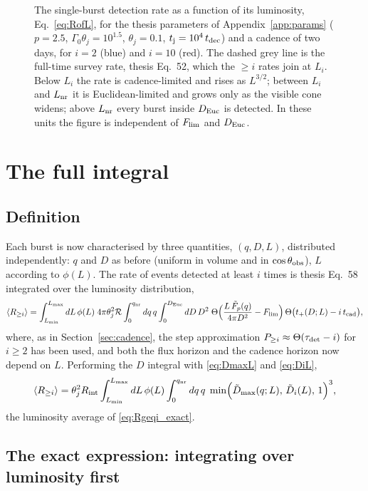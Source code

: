 \documentclass[11pt,a4paper]{article}
\newcommand{\tD}{\tilde{D}}
\newcommand{\tF}{\tilde{F}}
\newcommand{\Euc}{{\rm Euc}}
\newcommand{\nr}{{\rm nr}}
\newcommand{\Flim}{F_{\rm lim}}
\newcommand{\Rint}{R_{\rm int}}
\newcommand{\tcad}{t_{\rm cad}}
\newcommand{\tdec}{t_{\rm dec}}
\newcommand{\tj}{t_{\rm j}}
\newcommand{\Ravg}{\langle R_{\geq i}\rangle}
\newcommand{\Lmin}{L_{\rm min}}
\newcommand{\Lmax}{L_{\rm max}}
\newcommand{\Lnr}{L_{\rm nr}}
\begin{document}
\begin{figure}[t]
\caption{The single-burst detection rate as a function of its luminosity, Eq.~\eqref{eq:RofL}, for the thesis parameters of Appendix~\ref{app:params} ($p=2.5$, $\Gamma_0\theta_j=10^{1.5}$, $\theta_j=0.1$, $\tj=10^4\,\tdec$) and a cadence of two days, for $i=2$ (blue) and $i=10$ (red). The dashed grey line is the full-time survey rate, thesis Eq.~52, which the $\geq i$ rates join at $L_i$. Below $L_i$ the rate is cadence-limited and rises as $L^{3/2}$; between $L_i$ and $\Lnr$ it is Euclidean-limited and grows only as the visible cone widens; above $\Lnr$ every burst inside $D_\Euc$ is detected. In these units the figure is independent of $\Flim$ and $D_\Euc$.}
\label{fig:RofL}
\end{figure}

\section{The full integral}
\label{sec:integral}

\subsection{Definition}

Each burst is now characterised by three quantities, $(q,D,L)$, distributed independently: $q$ and $D$ as before (uniform in volume and in $\cos\theta_{\rm obs}$), $L$ according to $\phi(L)$. The rate of events detected at least $i$ times is thesis Eq.~58 integrated over the luminosity distribution,
\begin{equation}
\label{eq:full3}
\Ravg=\int_{\Lmin}^{\Lmax}dL\,\phi(L)\;4\pi\theta_j^2\mathcal R\int_0^{q_\nr}dq\,q\int_0^{D_\Euc}dD\,D^2\;\Theta\Bigl(\frac{L\,\tF_p(q)}{4\pi D^2}-\Flim\Bigr)\,\Theta\bigl(t_+(D;L)-i\,\tcad\bigr),
\end{equation}
where, as in Section~\ref{sec:cadence}, the step approximation $P_{\geq i}\approx\Theta(\tau_{\rm det}-i)$ for $i\geq2$ has been used, and both the flux horizon and the cadence horizon now depend on $L$. Performing the $D$ integral with \eqref{eq:DmaxL} and \eqref{eq:DiL},
\begin{equation}
\label{eq:full2}
\Ravg=\theta_j^2\Rint\int_{\Lmin}^{\Lmax}dL\,\phi(L)\int_0^{q_\nr}dq\,q\;\min\Bigl(\tD_{\max}(q;L),\,\tD_i(L),\,1\Bigr)^3 ,
\end{equation}
the luminosity average of \eqref{eq:Rgeqi_exact}.

\subsection{The exact expression: integrating over luminosity first}
\label{sec:exact}
\end{document}
